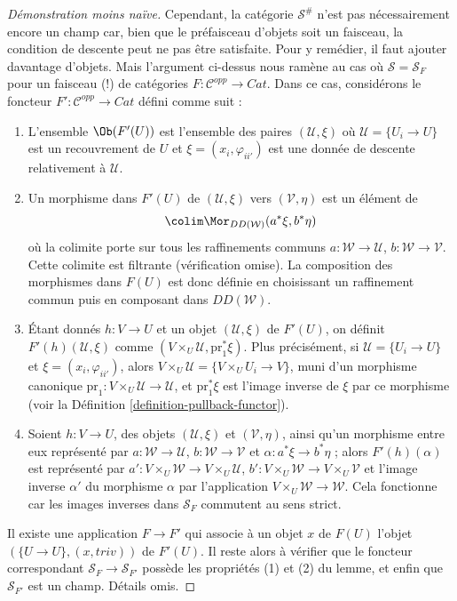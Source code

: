 \begin{proof}[Démonstration moins naïve]
\medskip\noindent
Cependant, la catégorie $\mathcal{S}^\#$ n'est pas nécessairement encore un
champ car, bien que le préfaisceau d'objets soit un faisceau,
la condition de descente peut ne pas être satisfaite.
Pour y remédier, il faut ajouter davantage d'objets. Mais l'argument
ci-dessus nous ramène au cas où $\mathcal{S} = \mathcal{S}_F$
pour un faisceau (!) de catégories
$F : \mathcal{C}^{opp} \to \textit{Cat}$. Dans ce cas, considérons le foncteur
$F' : \mathcal{C}^{opp} \to \textit{Cat}$ défini comme suit :
\begin{enumerate}
\item L'ensemble $\Ob(F'(U))$ est l'ensemble des paires
$(\mathcal{U}, \xi)$ où $\mathcal{U} = \{U_i \to U\}$
est un recouvrement de $U$ et $\xi = (x_i, \varphi_{ii'})$ est
une donnée de descente relativement à $\mathcal{U}$.
\item Un morphisme dans $F'(U)$ de
$(\mathcal{U}, \xi)$ vers $(\mathcal{V}, \eta)$
est un élément de
$$
\colim \Mor_{DD(\mathcal{W})}(a^*\xi, b^*\eta)
$$
où la colimite porte sur tous les raffinements communs
$a : \mathcal{W} \to \mathcal{U}$, $b : \mathcal{W} \to \mathcal{V}$.
Cette colimite est filtrante (vérification omise).
La composition des morphismes dans $F(U)$ est donc définie en
choisissant un raffinement commun puis en composant dans $DD(\mathcal{W})$.
\item Étant donnés $h : V \to U$ et un objet
$(\mathcal{U}, \xi)$ de $F'(U)$, on définit $F'(h)(\mathcal{U}, \xi)$
comme $(V \times_U \mathcal{U}, \text{pr}_1^*\xi)$.
Plus précisément, si $\mathcal{U} = \{U_i \to U\}$
et $\xi = (x_i, \varphi_{ii'})$, alors
$V \times_U \mathcal{U} = \{V \times_U U_i \to V\}$,
muni d'un morphisme canonique
$\text{pr}_1 : V \times_U \mathcal{U} \to \mathcal{U}$, et
$\text{pr}_1^*\xi$ est l'image inverse de $\xi$ par
ce morphisme (voir la Définition \ref{definition-pullback-functor}).
\item Soient $h : V \to U$, des objets $(\mathcal{U}, \xi)$
et $(\mathcal{V}, \eta)$, ainsi qu'un morphisme entre eux représenté par
$a : \mathcal{W} \to \mathcal{U}$, $b : \mathcal{W} \to \mathcal{V}$
et $\alpha : a^*\xi \to b^*\eta$ ; alors $F'(h)(\alpha)$ est
représenté par
$a' : V \times_U\mathcal{W} \to V \times_U\mathcal{U}$,
$b' : V \times_U\mathcal{W} \to V \times_U\mathcal{V}$
et l'image inverse $\alpha'$ du morphisme $\alpha$ par
l'application $V \times_U \mathcal{W} \to \mathcal{W}$. Cela fonctionne
car les images inverses dans $\mathcal{S}_F$ commutent au sens strict.
\end{enumerate}
Il existe une application $F \to F'$ qui associe à
un objet $x$ de $F(U)$ l'objet $(\{U \to U\}, (x, triv))$ de
$F'(U)$. Il reste alors à vérifier que le foncteur correspondant
$\mathcal{S}_F \to \mathcal{S}_{F'}$ possède les propriétés (1)
et (2) du lemme, et enfin que $\mathcal{S}_{F'}$ est
un champ. Détails omis.
\end{proof}

